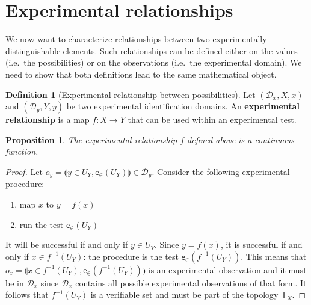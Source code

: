 \documentclass[review]{elsarticle}
\theoremstyle{plain}%
\newtheorem{prop}[thm]{Proposition}
\theoremstyle{definition}
\newtheorem{defn}{Definition}[section]
\theoremstyle{remark}
\begin{document}
\section{Experimental relationships}

We now want to characterize relationships between two experimentally distinguishable elements. Such relationships can be defined either on the values (i.e.~the possibilities) or on the observations (i.e.~the experimental domain). We need to show that both definitions lead to the same mathematical object.

\begin{defn}[Experimental relationship between possibilities]
	Let $(\mathcal{D}_x, X, x)$ and $(\mathcal{D}_y, Y, y)$ be two experimental identification domains. An \textbf{experimental relationship} is a map $f : X \rightarrow Y$ that can be used within an experimental test.
\end{defn}

\begin{prop}
	The experimental relationship $f$ defined above is a continuous function.
\end{prop}
\begin{proof}
Let $o_y = \llparenthesis y\in U_Y,\mathsf{e}_{\in}(U_Y)\rrparenthesis \in \mathcal{D}_y$.  Consider the following experimental procedure:
\begin{enumerate}
	\item map $x$ to $y=f(x)$
	\item run the test $\mathsf{e}_{\in}(U_Y)$
\end{enumerate}
It will be successful if and only if $y \in U_Y$. Since $y=f(x)$, it is successful if and only if $x \in f^{-1}(U_Y)$: the procedure is the test $\mathsf{e}_{\in}(f^{-1}(U_Y))$. This means that $o_x = \llparenthesis x \in f^{-1}(U_Y),\mathsf{e}_{\in}(f^{-1}(U_Y))\rrparenthesis$ is an experimental observation and it must be in $\mathcal{D}_x$ since $\mathcal{D}_x$ contains all possible experimental observations of that form. It follows that $f^{-1}(U_Y)$ is a verifiable set and must be part of the topology $\mathsf{T}_X$.
\end{proof}
\end{document}

